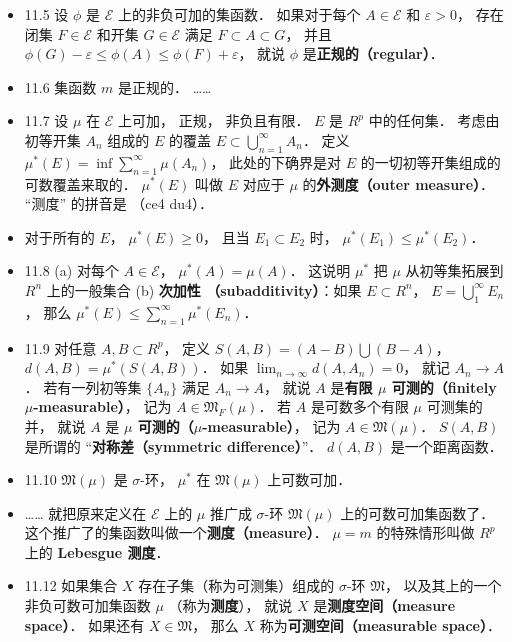 \begin{itemize}
\item 11.5 设 $\phi$ 是 $\mathscr E$ 上的非负可加的集函数． 如果对于每个 $A\in \mathscr E$ 和 $\varepsilon>0$， 存在闭集 $F\in \mathscr E$ 和开集 $G\in\mathscr E$ 满足 $F\subset A\subset G$， 并且 $\phi(G)-\varepsilon \leqslant \phi(A) \leqslant \phi(F) + \varepsilon$， 就说 $\phi$ 是\textbf{正规的（regular）}．

\item 11.6 集函数 $m$ 是正规的． ……

\item 11.7 设 $\mu$ 在 $\mathscr E$ 上可加， 正规， 非负且有限． $E$ 是 $R^p$ 中的任何集． 考虑由初等开集 $A_n$ 组成的 $E$ 的覆盖 $E\subset \bigcup_{n=1}^\infty A_n$． 定义 $\mu^*(E) = \inf \sum_{n=1}^\infty \mu(A_n)$， 此处的下确界是对 $E$ 的一切初等开集组成的可数覆盖来取的． $\mu^*(E)$ 叫做 $E$ 对应于 $\mu$ 的\textbf{外测度（outer measure）}． “测度” 的拼音是 （ce4 du4）．

\item 对于所有的 $E$， $\mu^*(E)\geqslant 0$， 且当 $E_1\subset E_2$ 时， $\mu^*(E_1) \leqslant \mu^*(E_2)$．

\item 11.8 (a) 对每个 $A\in \mathscr E$， $\mu^*(A)=\mu(A)$． 这说明 $\mu^*$ 把 $\mu$ 从初等集拓展到 $R^n$ 上的一般集合 (b) \textbf{次加性 （subadditivity）}：如果 $E\subset R^n$， $E=\bigcup_1^\infty E_n$， 那么 $\mu^*(E)\leqslant \sum_{n=1}^\infty \mu^*(E_n)$．

\item 11.9 对任意 $A,B \subset R^p$， 定义 $S(A,B)=(A-B)\bigcup (B-A)$， $d(A,B)=\mu^*(S(A,B))$． 如果 $\lim_{n\to\infty} d(A,A_n)=0$， 就记 $A_n\to A$． 若有一列初等集 $\{A_n\}$ 满足 $A_n\to A$， 就说 $A$ 是\textbf{有限 $\mu$ 可测的（finitely $\mu$-measurable）}， 记为 $A\in \mathfrak M_F(\mu)$． 若 $A$ 是可数多个有限 $\mu$ 可测集的并， 就说 $A$ 是 \textbf{$\mu$ 可测的（$\mu$-measurable）}， 记为 $A\in \mathfrak M(\mu)$． $S(A,B)$ 是所谓的 “\textbf{对称差（symmetric difference）}”． $d(A,B)$ 是一个距离函数．

\item 11.10 $\mathfrak M(\mu)$ 是 $\sigma$-环， $\mu^*$ 在 $\mathfrak M(\mu)$ 上可数可加．

\item …… 就把原来定义在 $\mathscr E$ 上的 $\mu$ 推广成 $\sigma$-环 $\mathfrak M(\mu)$ 上的可数可加集函数了． 这个推广了的集函数叫做一个\textbf{测度（measure）}． $\mu=m$ 的特殊情形叫做 $R^p$ 上的 \textbf{Lebesgue 测度}．

\item 11.12 如果集合 $X$ 存在子集（称为可测集）组成的 $\sigma$-环 $\mathfrak M$， 以及其上的一个非负可数可加集函数 $\mu$ （称为\textbf{测度}）， 就说 $X$ 是\textbf{测度空间（measure space）}． 如果还有 $X\in \mathfrak M$， 那么 $X$ 称为\textbf{可测空间（measurable space）}．


\end{itemize}
